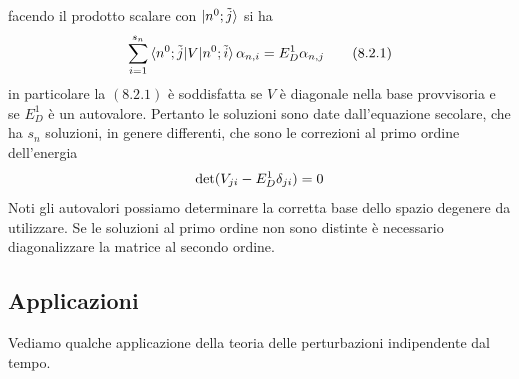\documentclass{article}
\begin{document}
facendo il prodotto scalare con $\ket{n^0; \tilde{j}}$ si ha
\begin{gather}
    \sum_{i = 1}^{s_n}\braket{n^0; \tilde{j}|V|n^0; \tilde{i}}\alpha_{n, i} = E_D^1\alpha_{n, j} \tag{8.2.1}
\end{gather}
in particolare la $(8.2.1)$ è soddisfatta se $V$ è diagonale nella base provvisoria e se $E_D^1$ è un autovalore. Pertanto le soluzioni sono date dall'equazione secolare, che ha $s_n$ soluzioni, in genere differenti, che sono le correzioni al primo ordine dell'energia
\begin{gather}
    \det(V_{ji} - E_D^1\delta_{ji}) = 0 \notag
\end{gather}
Noti gli autovalori possiamo determinare la corretta base dello spazio degenere da utilizzare. Se le soluzioni al primo ordine non sono distinte è necessario diagonalizzare la matrice al secondo ordine.

\subsection{Applicazioni}
Vediamo qualche applicazione della teoria delle perturbazioni indipendente dal tempo.
\end{document}
